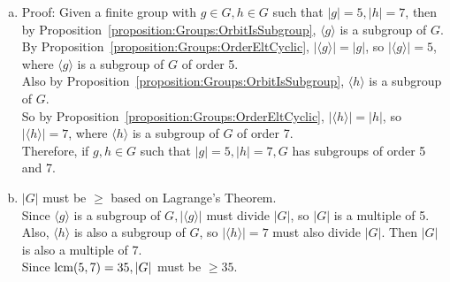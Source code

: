 \begin{enumerate}[(a)]
\item
Proof: Given a finite group with $g \in G, h \in G$ such that $|g| = 5, |h| = 7$, then by Proposition~\ref{proposition:Groups:OrbitIsSubgroup}, $\langle g \rangle$ is a subgroup of $G$.
\\
By Proposition~\ref{proposition:Groups:OrderEltCyclic}, $|\langle g \rangle| = |g|$, so $|\langle g \rangle| = 5$, where $\langle g \rangle$ is a subgroup of $G$ of order 5.
\\
Also by Proposition~\ref{proposition:Groups:OrbitIsSubgroup}, $\langle h \rangle$ is a subgroup of $G$.
\\
So by Proposition~\ref{proposition:Groups:OrderEltCyclic}, $|\langle h \rangle| = |h|$, so $|\langle h \rangle| = 7$, where $\langle h \rangle$ is a subgroup of $G$ of order 7.
\\
Therefore, if $g, h \in G$ such that $|g| = 5, |h| = 7, G$ has subgroups of order 5 and 7.

\item
$|G|$ must be $\geq$ based on Lagrange's Theorem.
\\
Since $\langle g \rangle$ is a subgroup of $G, |\langle g \rangle|$ must divide $|G|$, so $|G|$ is a multiple of 5.
\\
Also, $\langle h \rangle$ is also a subgroup of $G$, so $|\langle h \rangle| =7$ must also divide $|G|$.  Then $|G|$ is also a multiple of 7.
\\
Since $\operatorname{lcm}(5, 7) = 35, |G|$ must be $\geq 35$. 
\end{enumerate}

